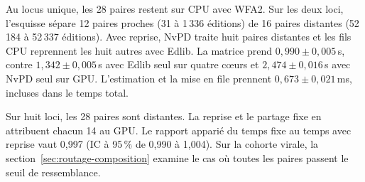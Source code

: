 Au locus unique, les 28 paires restent sur CPU avec WFA2. Sur les deux loci, l’esquisse sépare 12 paires proches (31 à 1\,336 éditions) de 16 paires distantes (52\,184 à 52\,337 éditions). Avec reprise, NvPD traite huit paires distantes et les fils CPU reprennent les huit autres avec Edlib. La matrice prend \(0{,}990\pm0{,}005\)\,s, contre \(1{,}342\pm0{,}005\)\,s avec Edlib seul sur quatre cœurs et \(2{,}474\pm0{,}016\)\,s avec NvPD seul sur GPU. L’estimation et la mise en file prennent \(0{,}673\pm0{,}021\)\,ms, incluses dans le temps total.

Sur huit loci, les 28 paires sont distantes. La reprise et le partage fixe en attribuent chacun 14 au GPU. Le rapport apparié du temps fixe au temps avec reprise vaut 0,997 (IC à 95\,\% de 0,990 à 1,004). Sur la cohorte virale, la section~\ref{sec:routage-composition} examine le cas où toutes les paires passent le seuil de ressemblance.

